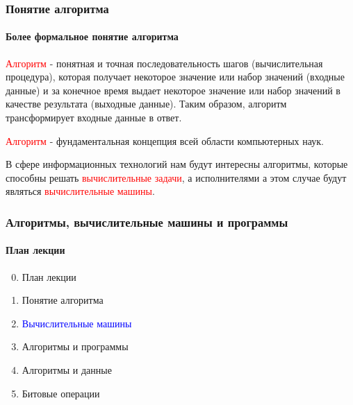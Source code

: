 \documentclass[aspectratio=169]{beamer}
\begin{document}
\begin{frame}
\frametitle{Понятие алгоритма}
\framesubtitle{Более формальное понятие алгоритма}
\justifying
\textcolor{red} {Алгоритм} - понятная и точная последовательность шагов (вычислительная процедура), которая получает некоторое значение или набор значений (входные данные) и за конечное время выдает некоторое значение или набор значений в качестве результата (выходные данные). \newline\newline
Таким образом, алгоритм трансформирует входные данные в ответ.\newline

\textcolor{red} {Алгоритм} - фундаментальная концепция всей области компьютерных наук.\newline

В сфере информационных технологий нам будут интересны алгоритмы, которые способны решать \textcolor{red}{вычислительные задачи}, а исполнителями а этом случае будут являться \textcolor{red}{вычислительные машины}.

\end{frame}

\begin{frame}
\frametitle{Алгоритмы, вычислительные машины и программы}
\framesubtitle{План лекции}

\begin{enumerate}
  \setcounter{enumi}{-1}
  \item{План лекции}
  \item{Понятие алгоритма}
  \item{\textcolor{blue}{Вычислительные машины}}
  \item{Алгоритмы и программы}
  \item{Алгоритмы и данные}
  \item{Битовые операции}

\end{enumerate}
\end{frame}
\end{document}
